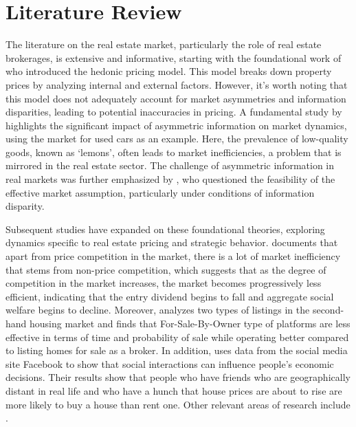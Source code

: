 \documentclass[11pt]{article}
\begin{document}
\section{Literature Review} \label{sec:literature_review}

The literature on the real estate market, particularly the role of real estate brokerages, is extensive and informative, starting with the foundational work of \citep{Rosen_hedonic} who introduced the hedonic pricing model. This model breaks down property prices by analyzing internal and external factors. However, it's worth noting that this model does not adequately account for market asymmetries and information disparities, leading to potential inaccuracies in pricing. A fundamental study by \citep{Akerlof_1970} highlights the significant impact of asymmetric information on market dynamics, using the market for used cars as an example. Here, the prevalence of low-quality goods, known as `lemons', often leads to market inefficiencies, a problem that is mirrored in the real estate sector. The challenge of asymmetric information in real markets was further emphasized by \citet{grossman_impossibility_1980}, who questioned the feasibility of the effective market assumption, particularly under conditions of information disparity. 

Subsequent studies have expanded on these foundational theories, exploring dynamics specific to real estate pricing and strategic behavior. \citet{550a6ccf-cde2-3dd1-979f-1a8db2b8ceb9} documents that apart from price competition in the market, there is a lot of market inefficiency that stems from non-price competition, which suggests that as the degree of competition in the market increases, the market becomes progressively less efficient, indicating that the entry dividend begins to fall and aggregate social welfare begins to decline. Moreover, \citet{hendel_relative_2009} analyzes two types of listings in the second-hand housing market and finds that For-Sale-By-Owner type of platforms are less effective in terms of time and probability of sale while operating better compared to listing homes for sale as a broker. In addition, \citet{bailey_economic_2018} uses data from the social media site Facebook to show that social interactions can influence people's economic decisions. Their results show that people who have friends who are geographically distant in real life and who have a hunch that house prices are about to rise are more likely to buy a house than rent one. Other relevant areas of research include \citep{SIRMANS1991207, NIEUWERBURGH_information, salz_intermediation_2022}.
\end{document}
